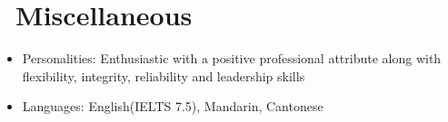 \documentclass{resume}
\begin{document}
\section{\faInfo\ Miscellaneous}
\begin{itemize}[parsep=0.5ex]
  \item Personalities: Enthusiastic with a positive professional attribute along with flexibility, integrity, reliability and leadership skills
  \item Languages: English(IELTS 7.5), Mandarin, Cantonese
\end{itemize}

%
%
\end{document}
